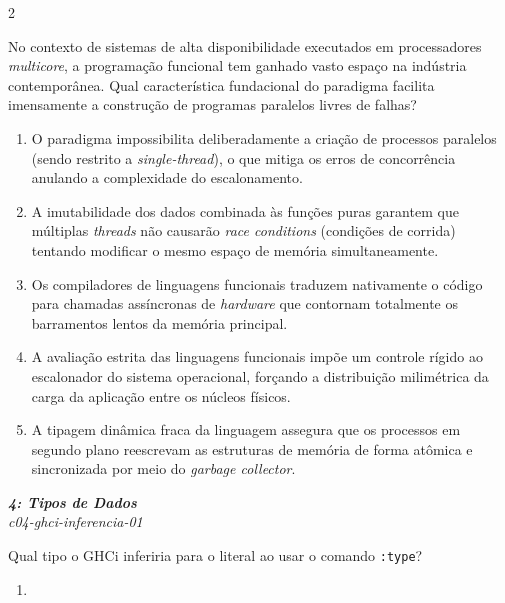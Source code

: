 \documentclass[a4paper,10pt,brazil]{article}
\begin{document}
\begin{multicols}{2}
\begin{flushright}
\end{flushright}
No contexto de sistemas de alta disponibilidade executados em processadores \emph{multicore}, a programação funcional tem ganhado vasto espaço na indústria contemporânea. Qual característica fundacional do paradigma facilita imensamente a construção de programas paralelos livres de falhas?

\begin{enumerate}
  \item O paradigma impossibilita deliberadamente a criação de processos paralelos (sendo restrito a \emph{single-thread}), o que mitiga os erros de concorrência anulando a complexidade do escalonamento.

  \item A imutabilidade dos dados combinada às funções puras garantem que múltiplas \emph{threads} não causarão \emph{race conditions} (condições de corrida) tentando modificar o mesmo espaço de memória simultaneamente.

  \item Os compiladores de linguagens funcionais traduzem nativamente o código para chamadas assíncronas de \emph{hardware} que contornam totalmente os barramentos lentos da memória principal.

  \item A avaliação estrita das linguagens funcionais impõe um controle rígido ao escalonador do sistema operacional, forçando a distribuição milimétrica da carga da aplicação entre os núcleos físicos.

  \item A tipagem dinâmica fraca da linguagem assegura que os processos em segundo plano reescrevam as estruturas de memória de forma atômica e sincronizada por meio do \emph{garbage collector}.


\end{enumerate}

\begin{flushright}
  \footnotesize
  \textit{\textbf{4: Tipos de Dados}}\\
  \textit{c04-ghci-inferencia-01}\\

\end{flushright}
Qual tipo o GHCi inferiria para o literal  ao usar o comando \texttt{:type}?

\begin{enumerate}
  \item {}


\end{enumerate}
\end{multicols}
\end{document}
